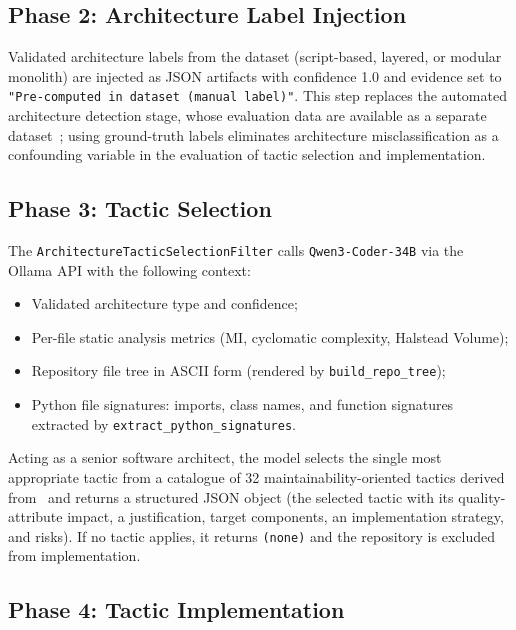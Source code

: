 \documentclass[runningheads]{llncs}
\begin{document}
\subsection{Phase 2: Architecture Label Injection}

Validated architecture labels from the dataset (script-based, layered, or modular monolith) are injected as JSON artifacts with confidence 1.0 and evidence set to \texttt{"Pre-computed in dataset (manual label)"}. This step replaces the automated architecture detection stage, whose evaluation data are available as a separate dataset~\cite{anon_archdetect_2026}; using ground-truth labels eliminates architecture misclassification as a confounding variable in the evaluation of tactic selection and implementation.

\subsection{Phase 3: Tactic Selection}
\label{sec:impl_tactic_selection}

The \texttt{ArchitectureTacticSelectionFilter} calls \texttt{Qwen3-Coder-34B} via the Ollama API with the following context:
\begin{itemize}[nosep]
    \item Validated architecture type and confidence;
    \item Per-file static analysis metrics (MI, cyclomatic complexity, Halstead Volume);
    \item Repository file tree in ASCII form (rendered by \texttt{build\_repo\_tree});
    \item Python file signatures: imports, class names, and function signatures extracted by \texttt{extract\_python\_signatures}.
\end{itemize}

Acting as a senior software architect, the model selects the single most appropriate tactic from a catalogue of 32 maintainability-oriented tactics derived from~\cite{marquez2022architectural} and returns a structured JSON object (the selected tactic with its quality-attribute impact, a justification, target components, an implementation strategy, and risks). If no tactic applies, it returns \texttt{(none)} and the repository is excluded from implementation.

\subsection{Phase 4: Tactic Implementation}
\label{sec:impl_tactic_implementation}
\end{document}
